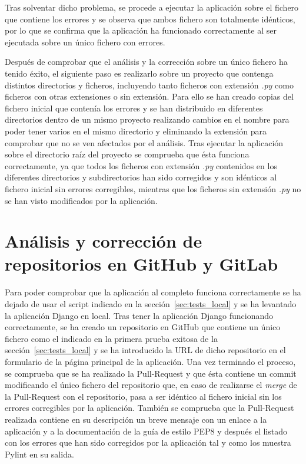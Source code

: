 \documentclass[a4paper, 12pt]{book}
\begin{document}
Tras solventar dicho problema, se procede a ejecutar la aplicación sobre el fichero que contiene los errores y se observa que ambos fichero son totalmente idénticos, por lo que se confirma que la aplicación ha funcionado correctamente al ser ejecutada sobre un único fichero con errores.

Después de comprobar que el análisis y la corrección sobre un único fichero ha tenido éxito, el siguiente paso es realizarlo sobre un proyecto que contenga distintos directorios y ficheros, incluyendo tanto ficheros con extensión \textit{.py} como ficheros con otras extensiones o sin extensión.
Para ello se han creado copias del fichero inicial que contenía los errores y se han distribuido en diferentes directorios dentro de un mismo proyecto realizando cambios en el nombre para poder tener varios en el mismo directorio y eliminando la extensión para comprobar que no se ven afectados por el análisis.
Tras ejecutar la aplicación sobre el directorio raíz del proyecto se comprueba que ésta funciona correctamente, ya que todos los ficheros con extensión \textit{.py} contenidos en los diferentes directorios y subdirectorios han sido corregidos y son idénticos al fichero inicial sin errores corregibles, mientras que los ficheros sin extensión \textit{.py} no se han visto modificados por la aplicación.

\section{Análisis y corrección de repositorios en GitHub y GitLab}
\label{sec:tests_repositorios}

Para poder comprobar que la aplicación al completo funciona correctamente se ha dejado de usar el script indicado en la sección~\ref{sec:tests_local} y se ha levantado la aplicación Django en local.
Tras tener la aplicación Django funcionando correctamente, se ha creado un repositorio en GitHub que contiene un único fichero como el indicado en la primera prueba exitosa de la sección~\ref{sec:tests_local} y se ha introducido la URL de dicho repositorio en el formulario de la página principal de la aplicación.
Una vez terminado el proceso, se comprueba que se ha realizado la Pull-Request y que ésta contiene un commit modificando el único fichero del repositorio que, en caso de realizarse el \textit{merge} de la Pull-Request con el repositorio, pasa a ser idéntico al fichero inicial sin los errores corregibles por la aplicación. También se comprueba que la Pull-Request realizada contiene en su descripción un breve mensaje con un enlace a la aplicación y a la documentación de la guía de estilo PEP8 y después el listado con los errores que han sido corregidos por la aplicación tal y como los muestra Pylint en su salida.
\end{document}
